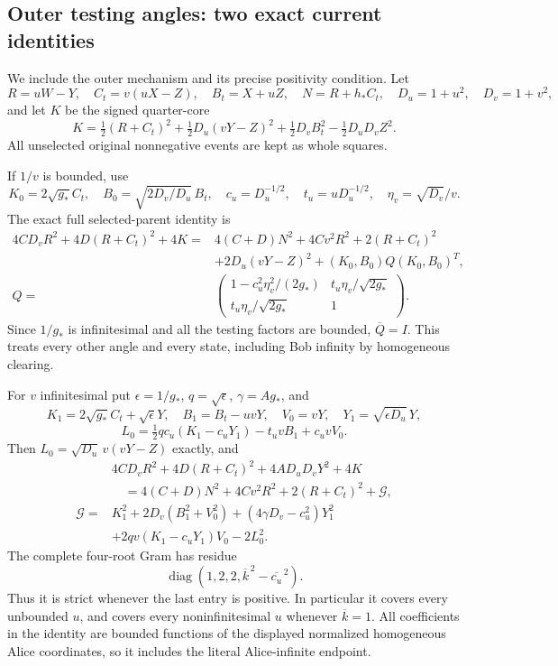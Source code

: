 \subsection{Outer testing angles: two exact current identities}

We include the outer mechanism and its precise positivity condition.
Let
\[
 R=uW-Y,\quad C_t=v(uX-Z),\quad B_t=X+uZ,\quad
 N=R+h_*C_t,\quad D_u=1+u^2,\quad D_v=1+v^2,
\]
and let $K$ be the signed quarter-core
\[
 K=\tfrac12(R+C_t)^2+\tfrac12D_u(vY-Z)^2
             +\tfrac12D_v B_t^2-\tfrac12D_uD_vZ^2.       \tag{R1N12}
\]
All unselected original nonnegative events are kept as whole squares.

If $1/v$ is bounded, use
\[
 K_0=2\sqrt{g_*}C_t,\quad
 B_0=\sqrt{2D_v/D_u}\,B_t,\quad
 c_u=D_u^{-1/2},\quad t_u=uD_u^{-1/2},\quad
 \eta_v=\sqrt{D_v}/v .
\]
The exact full selected-parent identity is
\begin{align*}
 4CD_vR^2+4D(R+C_t)^2+4K
 ={}&4(C+D)N^2+4Cv^2R^2+2(R+C_t)^2\\
 &+2D_u(vY-Z)^2+(K_0,B_0)Q(K_0,B_0)^T,\\
 Q={}&
 \begin{pmatrix}
 1-c_u^2\eta_v^2/(2g_*)&t_u\eta_v/\sqrt{2g_*}\\
 t_u\eta_v/\sqrt{2g_*}&1
 \end{pmatrix}.
\tag{R1N13}
\end{align*}
Since $1/g_*$ is infinitesimal and all the testing factors are bounded,
$\overline Q=I$.  This treats every other angle and every state,
including Bob infinity by homogeneous clearing.

For $v$ infinitesimal put $\epsilon=1/g_*$, $q=\sqrt\epsilon$,
$\gamma=Ag_*$, and
\[
 K_1=2\sqrt{g_*}C_t+\sqrt\epsilon Y,\quad
 B_1=B_t-uvY,\quad V_0=vY,\quad Y_1=\sqrt{\epsilon D_u}\,Y,
\]
\[
 L_0=\tfrac12qc_u(K_1-c_uY_1)-t_uvB_1+c_uvV_0.
\]
Then $L_0=\sqrt{D_u}\,v(vY-Z)$ exactly, and
\begin{align*}
 &4CD_vR^2+4D(R+C_t)^2+4AD_uD_vY^2+4K\\
 &\quad=4(C+D)N^2+4Cv^2R^2+2(R+C_t)^2+\mathcal G,\\
 \mathcal G={}&K_1^2+2D_v(B_1^2+V_0^2)
 +(4\gamma D_v-c_u^2)Y_1^2\\
 &+2qv(K_1-c_uY_1)V_0-2L_0^2 .
\tag{R1N14}
\end{align*}
The complete four-root Gram has residue
\[
 \operatorname{diag}(1,2,2,\overline{k}^{\,2}
                                      -\overline{c_u}^{\,2}).    \tag{R1N15}
\]
Thus it is strict whenever the last entry is positive.  In particular
it covers every unbounded $u$, and covers every noninfinitesimal
$u$ whenever $\overline k=1$.  All coefficients in the identity
are bounded functions of the displayed normalized homogeneous Alice
coordinates, so it includes the literal Alice-infinite endpoint.

